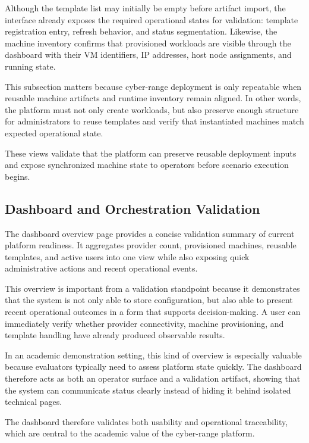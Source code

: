 Although the template list may initially be empty before artifact import, the interface already exposes the required operational states for validation: template registration entry, refresh behavior, and status segmentation. Likewise, the machine inventory confirms that provisioned workloads are visible through the dashboard with their VM identifiers, IP addresses, host node assignments, and running state.

This subsection matters because cyber-range deployment is only repeatable when reusable machine artifacts and runtime inventory remain aligned. In other words, the platform must not only create workloads, but also preserve enough structure for administrators to reuse templates and verify that instantiated machines match expected operational state.



These views validate that the platform can preserve reusable deployment inputs and expose synchronized machine state to operators before scenario execution begins.

\subsection{Dashboard and Orchestration Validation}
The dashboard overview page provides a concise validation summary of current platform readiness. It aggregates provider count, provisioned machines, reusable templates, and active users into one view while also exposing quick administrative actions and recent operational events.

This overview is important from a validation standpoint because it demonstrates that the system is not only able to store configuration, but also able to present recent operational outcomes in a form that supports decision-making. A user can immediately verify whether provider connectivity, machine provisioning, and template handling have already produced observable results.

In an academic demonstration setting, this kind of overview is especially valuable because evaluators typically need to assess platform state quickly. The dashboard therefore acts as both an operator surface and a validation artifact, showing that the system can communicate status clearly instead of hiding it behind isolated technical pages.


The dashboard therefore validates both usability and operational traceability, which are central to the academic value of the cyber-range platform.

